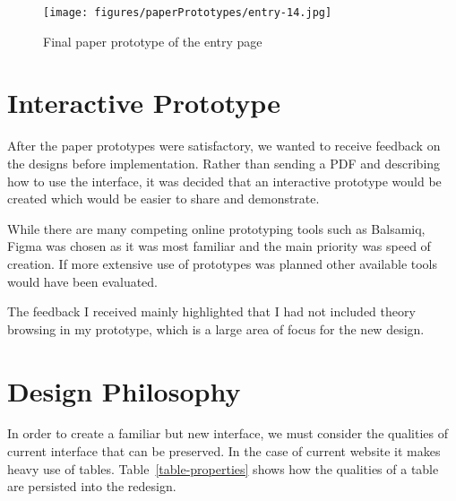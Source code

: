 \documentclass[bsc,frontabs,oneside,singlespacing,parskip,deptreport,logo]{infthesis}
\begin{document}
\begin{figure}[h]
    \centering
    \texttt{[image: figures/paperPrototypes/entry-14.jpg]}
    \caption{Final paper prototype of the entry page}
    \label{paper-entry}
\end{figure}

\section{Interactive Prototype}
\cbstart
After the paper prototypes were satisfactory, we wanted to receive feedback on the designs before implementation. Rather than sending a PDF and describing how to use the interface, it was decided that an interactive prototype would be created which would be easier to share and demonstrate.
\cbend

While there are many competing online prototyping tools such as Balsamiq, Figma was chosen as it was most familiar and the main priority was speed of creation. If more extensive use of prototypes was planned other available tools would have been evaluated.

The feedback I received mainly highlighted that I had not included theory browsing in my prototype, which is a large area of focus for the new design.

\section{Design Philosophy}

In order to create a familiar but new interface, we must consider the qualities of current interface that can be preserved. In the case of current website it makes heavy use of tables. Table~\ref{table-properties} shows how the qualities of a table are persisted into the redesign.
\end{document}
